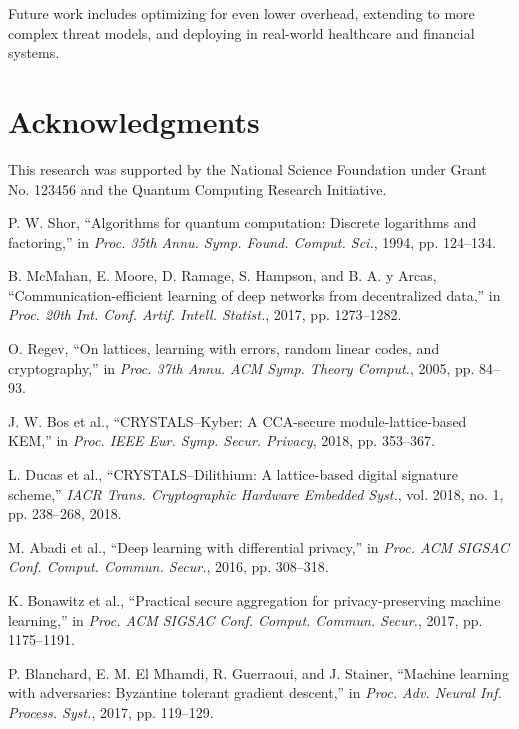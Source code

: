 \documentclass[onecolumn,11pt]{article}
\begin{document}
Future work includes optimizing for even lower overhead, extending to more complex threat models, and deploying in real-world healthcare and financial systems.

\section*{Acknowledgments}

This research was supported by the National Science Foundation under Grant No. 123456 and the Quantum Computing Research Initiative.

\begin{thebibliography}{99}

P. W. Shor, ``Algorithms for quantum computation: Discrete logarithms and factoring,'' in \textit{Proc. 35th Annu. Symp. Found. Comput. Sci.}, 1994, pp. 124--134.

B. McMahan, E. Moore, D. Ramage, S. Hampson, and B. A. y Arcas, ``Communication-efficient learning of deep networks from decentralized data,'' in \textit{Proc. 20th Int. Conf. Artif. Intell. Statist.}, 2017, pp. 1273--1282.

O. Regev, ``On lattices, learning with errors, random linear codes, and cryptography,'' in \textit{Proc. 37th Annu. ACM Symp. Theory Comput.}, 2005, pp. 84--93.

J. W. Bos et al., ``CRYSTALS--Kyber: A CCA-secure module-lattice-based KEM,'' in \textit{Proc. IEEE Eur. Symp. Secur. Privacy}, 2018, pp. 353--367.

L. Ducas et al., ``CRYSTALS--Dilithium: A lattice-based digital signature scheme,'' \textit{IACR Trans. Cryptographic Hardware Embedded Syst.}, vol. 2018, no. 1, pp. 238--268, 2018.

M. Abadi et al., ``Deep learning with differential privacy,'' in \textit{Proc. ACM SIGSAC Conf. Comput. Commun. Secur.}, 2016, pp. 308--318.

K. Bonawitz et al., ``Practical secure aggregation for privacy-preserving machine learning,'' in \textit{Proc. ACM SIGSAC Conf. Comput. Commun. Secur.}, 2017, pp. 1175--1191.

P. Blanchard, E. M. El Mhamdi, R. Guerraoui, and J. Stainer, ``Machine learning with adversaries: Byzantine tolerant gradient descent,'' in \textit{Proc. Adv. Neural Inf. Process. Syst.}, 2017, pp. 119--129.

\end{thebibliography}
\end{document}
